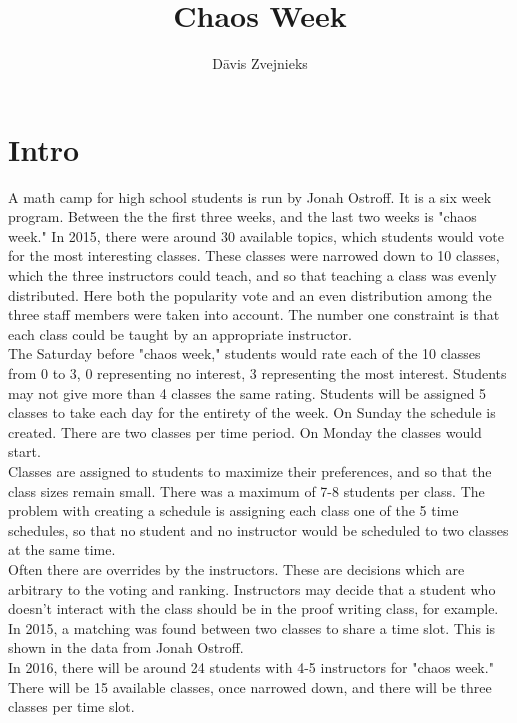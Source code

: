 \documentclass[11pt]{article}
\title{\textbf{Chaos Week}}
\author{Dāvis Zvejnieks}
\date{}
\begin{document}
\maketitle

\section{Intro}

A math camp for high school students is run by Jonah Ostroff. It is a six week program. Between the the first three weeks, and the last two weeks is "chaos week." In 2015, there were around 30 available topics, which students would vote for the most interesting classes. These classes were narrowed down to 10 classes, which the three instructors could teach, and so that teaching a class was evenly distributed. Here both the popularity vote and an even distribution among the three staff members were taken into account. The number one constraint is that each class could be taught by an appropriate instructor.\\
\indent The Saturday before "chaos week," students would rate each of the 10 classes from 0 to 3, 0 representing no interest, 3 representing the most interest. Students may not give more than 4 classes the same rating. Students will be assigned 5 classes to take each day for the entirety of the week. On Sunday the schedule is created. There are two classes per time period. On Monday the classes would start.\\
\indent Classes are assigned to students to maximize their preferences, and so that the class sizes remain small. There was a maximum of 7-8 students per class. The problem with creating a schedule is assigning each class one of the 5 time schedules, so that no student and no instructor would be scheduled to two classes at the same time.\\
\indent Often there are overrides by the instructors. These are decisions which are arbitrary to the voting and ranking. Instructors may decide that a student who doesn't interact with the class should be in the proof writing class, for example.\\
\indent In 2015, a matching was found between two classes to share a time slot. This is shown in the data from Jonah Ostroff.\\
\indent In 2016, there will be around 24 students with 4-5 instructors for "chaos week." There will be 15 available classes, once narrowed down, and there will be three classes per time slot.
\end{document}
